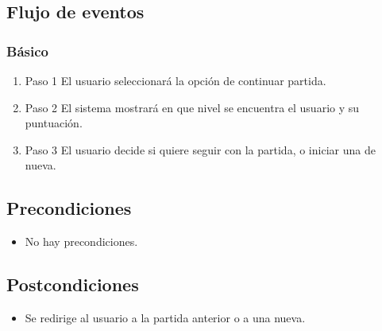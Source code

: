 \subsection{Flujo de eventos}

\subsubsection{Básico}

\begin{enumerate}
\item Paso 1
El usuario seleccionará la opción de continuar partida.
\item Paso 2
El sistema mostrará en que nivel se encuentra el usuario y su puntuación.
\item Paso 3
El usuario decide si quiere seguir con la partida, o iniciar una de nueva.
\end{enumerate}

\subsection{Precondiciones}
\begin{itemize}
\item No hay precondiciones.
\end{itemize}
\subsection{Postcondiciones}
\begin{itemize}
\item Se redirige al usuario a la partida anterior o a una nueva.
\end{itemize}


